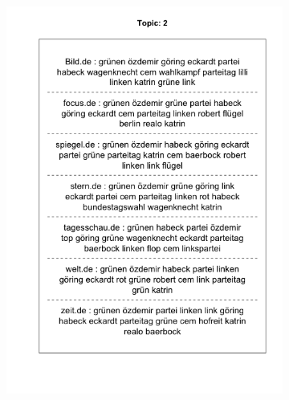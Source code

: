 \documentclass[12pt,a4paper,notitlepage]{article}
\begin{document}
\begin{figure}[H]
\begin{center}
\begin{subfigure}[normla]{0.49\textwidth}
			\includegraphics[width=\textwidth]{figs/plotquote2.png}
		\end{subfigure}
	\end{center}
\end{figure}
	
\end{document}
